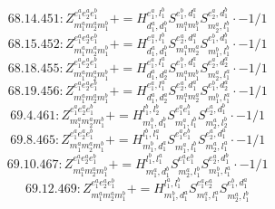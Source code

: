 \documentclass[letterpaper,10pt,fleqn,leqno,onecolumn]{article}
\begin{document}
\begin{equation} \;\;\;\;\;\;  68.14.451: Z^{e_{1}^{a}e_{2}^{a}e_{1}^{b}}_{m_{1}^{a}m_{2}^{a}m_{1}^{b}}+=H^{e_{1}^{a},l_{1}^{b}}_{d_{1}^{a},d_{1}^{b}}S^{e_{1}^{b},d_{1}^{a}}_{m_{1}^{a}m_{1}^{b}}S^{e_{2}^{a},d_{1}^{b}}_{m_{2}^{a},l_{1}^{b}}\cdot -1/1 \end{equation}
\begin{equation} \;\;\;\;\;\;  68.15.452: Z^{e_{1}^{a}e_{2}^{a}e_{1}^{b}}_{m_{1}^{a}m_{2}^{a}m_{1}^{b}}+=H^{e_{1}^{a},l_{1}^{b}}_{d_{1}^{a},d_{1}^{b}}S^{e_{2}^{a},d_{1}^{a}}_{m_{1}^{a}m_{2}^{a}}S^{e_{1}^{b},d_{1}^{b}}_{m_{1}^{b},l_{1}^{b}}\cdot -1/1 \end{equation}
\begin{equation} \;\;\;\;\;\;  68.18.455: Z^{e_{1}^{a}e_{2}^{a}e_{1}^{b}}_{m_{1}^{a}m_{2}^{a}m_{1}^{b}}+=H^{e_{1}^{a},l_{1}^{a}}_{d_{1}^{a},d_{2}^{a}}S^{e_{1}^{b},d_{1}^{a}}_{m_{1}^{a}m_{1}^{b}}S^{e_{2}^{a},d_{2}^{a}}_{m_{2}^{a},l_{1}^{a}}\cdot -1/1 \end{equation}
\begin{equation} \;\;\;\;\;\;  68.19.456: Z^{e_{1}^{a}e_{2}^{a}e_{1}^{b}}_{m_{1}^{a}m_{2}^{a}m_{1}^{b}}+=H^{e_{1}^{a},l_{1}^{a}}_{d_{1}^{a},d_{2}^{a}}S^{e_{2}^{a},d_{1}^{a}}_{m_{1}^{a}m_{2}^{a}}S^{e_{1}^{b},d_{2}^{a}}_{m_{1}^{b},l_{1}^{a}}\cdot -1/1 \end{equation}
\begin{equation} \;\;\;\;\;\;  69.4.461: Z^{e_{1}^{a}e_{2}^{a}e_{1}^{b}}_{m_{1}^{a}m_{2}^{a}m_{1}^{b}}+=H^{l_{1}^{b},l_{2}^{b}}_{m_{1}^{b},d_{1}^{b}}S^{e_{1}^{a}e_{1}^{b}}_{m_{1}^{a},l_{1}^{b}}S^{e_{2}^{a},d_{1}^{b}}_{m_{2}^{a},l_{2}^{b}}\cdot -1/1 \end{equation}
\begin{equation} \;\;\;\;\;\;  69.8.465: Z^{e_{1}^{a}e_{2}^{a}e_{1}^{b}}_{m_{1}^{a}m_{2}^{a}m_{1}^{b}}+=H^{l_{1}^{b},l_{1}^{a}}_{m_{1}^{b},d_{1}^{a}}S^{e_{1}^{a}e_{1}^{b}}_{m_{1}^{a},l_{1}^{b}}S^{e_{2}^{a},d_{1}^{a}}_{m_{2}^{a},l_{1}^{a}}\cdot -1/1 \end{equation}
\begin{equation} \;\;\;\;\;\;  69.10.467: Z^{e_{1}^{a}e_{2}^{a}e_{1}^{b}}_{m_{1}^{a}m_{2}^{a}m_{1}^{b}}+=H^{l_{1}^{b},l_{1}^{a}}_{m_{1}^{a},d_{1}^{b}}S^{e_{1}^{a}e_{1}^{b}}_{m_{2}^{a},l_{1}^{b}}S^{e_{2}^{a},d_{1}^{b}}_{m_{1}^{b},l_{1}^{a}}\cdot -1/1 \end{equation}
\begin{equation} \;\;\;\;\;\;  69.12.469: Z^{e_{1}^{a}e_{2}^{a}e_{1}^{b}}_{m_{1}^{a}m_{2}^{a}m_{1}^{b}}+=H^{l_{1}^{a},l_{1}^{b}}_{m_{1}^{b},d_{1}^{a}}S^{e_{1}^{a}e_{2}^{a}}_{m_{1}^{a},l_{1}^{a}}S^{e_{1}^{b},d_{1}^{a}}_{m_{2}^{a},l_{1}^{b}} \end{equation}
\end{document}

